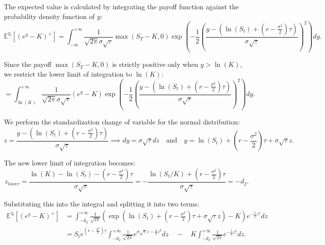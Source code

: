 \documentclass{article}
\theoremstyle{definition}
\theoremstyle{remark}
\begin{document}
The expected value is calculated by integrating the payoff function against the probability density function of $y$:
\begin{equation*}
    \mathbb{E}^{\mathbb{Q}} \left[ (e^y - K)^+ \right] = \int_{-\infty}^{+\infty} \frac{1}{\sqrt{2\pi}\sigma\sqrt{\tau}} \max(S_T-K,0) \exp\left( -\frac{1}{2} \left( \frac{y - \left(\ln(S_t) + (r - \frac{\sigma^2}{2})\tau\right)}{\sigma\sqrt{\tau}} \right)^2 \right) dy.
\end{equation*}

Since the payoff $\max(S_T-K,0)$ is strictly positive only when $y > \ln(K)$, we restrict the lower limit of integration to $\ln(K)$:
\begin{equation*}
    = \int_{\ln(K)}^{+\infty} \frac{1}{\sqrt{2\pi}\sigma\sqrt{\tau}} (e^y - K) \exp\left( -\frac{1}{2} \left( \frac{y - \left(\ln(S_t) + (r - \frac{\sigma^2}{2})\tau\right)}{\sigma\sqrt{\tau}} \right)^2 \right) dy.
\end{equation*}

We perform the standardization change of variable for the normal distribution:
\begin{equation*}
    z = \frac{y - \left(\ln(S_t) + (r - \frac{\sigma^2}{2})\tau\right)}{\sigma\sqrt{\tau}} \implies dy = \sigma\sqrt{\tau} dz \quad \text{and} \quad y = \ln(S_t) + \left(r - \frac{\sigma^2}{2}\right)\tau + \sigma\sqrt{\tau} z.
\end{equation*}

The new lower limit of integration becomes:
\begin{equation*}
    z_{lower} = \frac{\ln(K) - \ln(S_t) - \left(r - \frac{\sigma^2}{2}\right)\tau}{\sigma\sqrt{\tau}} = - \frac{\ln(S_t/K) + \left(r - \frac{\sigma^2}{2}\right)\tau}{\sigma\sqrt{\tau}} = -d_2.
\end{equation*}

Substituting this into the integral and splitting it into two terms:
\begin{align*}
    \mathbb{E}^{\mathbb{Q}} \left[ (e^y - K)^+ \right] &= \int_{-d_2}^{+\infty} \frac{1}{\sqrt{2\pi}} \left( \exp\left( \ln(S_t) + \left(r - \frac{\sigma^2}{2}\right)\tau + \sigma\sqrt{\tau} z \right) - K \right) e^{-\frac{1}{2} z^2} dz \\
    &= S_t e^{\left(r - \frac{\sigma^2}{2}\right)\tau} \int_{-d_2}^{+\infty} \frac{1}{\sqrt{2\pi}} e^{\sigma\sqrt{\tau} z - \frac{1}{2}z^2} dz \quad - \quad K \int_{-d_2}^{+\infty} \frac{1}{\sqrt{2\pi}} e^{-\frac{1}{2}z^2} dz.
\end{align*}
\end{document}
